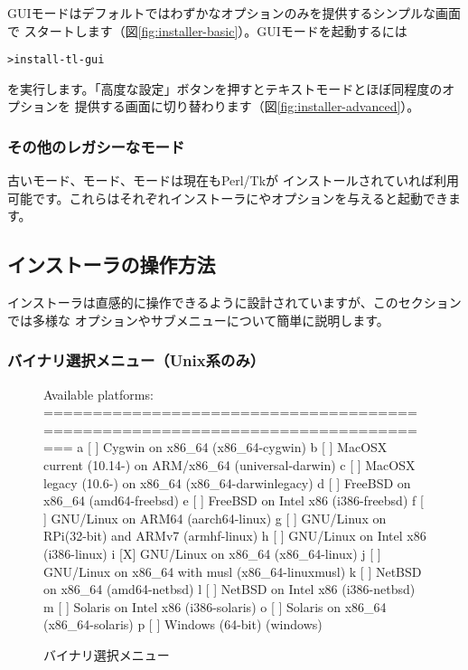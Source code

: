 \documentclass[uplatex,dvipdfmx,12pt,tombow]{jsarticle}
\begin{document}
GUIモードはデフォルトではわずかなオプションのみを提供するシンプルな画面で
スタートします（図\ref{fig:installer-basic}）。GUIモードを起動するには
%
\begin{alltt}
> install-tl -gui
\end{alltt}
%
を実行します。「高度な設定」ボタンを押すとテキストモードとほぼ同程度のオプションを
提供する画面に切り替わります（図\ref{fig:installer-advanced}）。

\subsubsection{その他のレガシーなモード}

古いモード、モード、モードは現在もPerl/Tkが
インストールされていれば利用可能です。これらはそれぞれインストーラにやオプションを与えると起動できます。

\subsection{インストーラの操作方法}
\label{sec:runinstall}

インストーラは直感的に操作できるように設計されていますが、このセクションでは多様な
オプションやサブメニューについて簡単に説明します。

\subsubsection{バイナリ選択メニュー（Unix系のみ）}
\label{sec:binary}

\begin{figure}[tb]
\begin{boxedverbatim}
Available platforms:
===============================================================================
   a [ ] Cygwin on x86_64 (x86_64-cygwin)
   b [ ] MacOSX current (10.14-) on ARM/x86_64 (universal-darwin)
   c [ ] MacOSX legacy (10.6-) on x86_64 (x86_64-darwinlegacy)
   d [ ] FreeBSD on x86_64 (amd64-freebsd)
   e [ ] FreeBSD on Intel x86 (i386-freebsd)
   f [ ] GNU/Linux on ARM64 (aarch64-linux)
   g [ ] GNU/Linux on RPi(32-bit) and ARMv7 (armhf-linux)
   h [ ] GNU/Linux on Intel x86 (i386-linux)
   i [X] GNU/Linux on x86_64 (x86_64-linux)
   j [ ] GNU/Linux on x86_64 with musl (x86_64-linuxmusl)
   k [ ] NetBSD on x86_64 (amd64-netbsd)
   l [ ] NetBSD on Intel x86 (i386-netbsd)
   m [ ] Solaris on Intel x86 (i386-solaris)
   o [ ] Solaris on x86_64 (x86_64-solaris)
   p [ ] Windows (64-bit) (windows)
\end{boxedverbatim}
\vspace{-1zh}
\caption{バイナリ選択メニュー}\label{fig:bin-text}
\end{figure}
\end{document}
